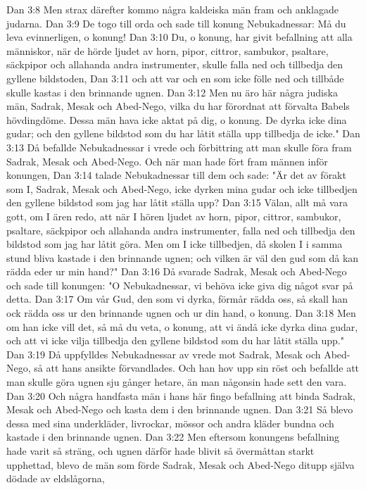 Dan 3:8  Men strax därefter kommo några kaldeiska män fram och anklagade judarna.
Dan 3:9  De togo till orda och sade till konung Nebukadnessar: Må du leva evinnerligen, o konung!
Dan 3:10  Du, o konung, har givit befallning att alla människor, när de hörde ljudet av horn, pipor, cittror, sambukor, psaltare, säckpipor och allahanda andra instrumenter, skulle falla ned och tillbedja den gyllene bildstoden,
Dan 3:11  och att var och en som icke fölle ned och tillbåde skulle kastas i den brinnande ugnen.
Dan 3:12  Men nu äro här några judiska män, Sadrak, Mesak och Abed-Nego, vilka du har förordnat att förvalta Babels hövdingdöme. Dessa män hava icke aktat på dig, o konung. De dyrka icke dina gudar; och den gyllene bildstod som du har låtit ställa upp tillbedja de icke."
Dan 3:13  Då befallde Nebukadnessar i vrede och förbittring att man skulle föra fram Sadrak, Mesak och Abed-Nego. Och när man hade fört fram männen inför konungen,
Dan 3:14  talade Nebukadnessar till dem och sade: "Är det av förakt som I, Sadrak, Mesak och Abed-Nego, icke dyrken mina gudar och icke tillbedjen den gyllene bildstod som jag har låtit ställa upp?
Dan 3:15  Välan, allt må vara gott, om I ären redo, att när I hören ljudet av horn, pipor, cittror, sambukor, psaltare, säckpipor och allahanda andra instrumenter, falla ned och tillbedja den bildstod som jag har låtit göra. Men om I icke tillbedjen, då skolen I i samma stund bliva kastade i den brinnande ugnen; och vilken är väl den gud som då kan rädda eder ur min hand?"
Dan 3:16  Då svarade Sadrak, Mesak och Abed-Nego och sade till konungen: "O Nebukadnessar, vi behöva icke giva dig något svar på detta.
Dan 3:17  Om vår Gud, den som vi dyrka, förmår rädda oss, så skall han ock rädda oss ur den brinnande ugnen och ur din hand, o konung.
Dan 3:18  Men om han icke vill det, så må du veta, o konung, att vi ändå icke dyrka dina gudar, och att vi icke vilja tillbedja den gyllene bildstod som du har låtit ställa upp."
Dan 3:19  Då uppfylldes Nebukadnessar av vrede mot Sadrak, Mesak och Abed-Nego, så att hans ansikte förvandlades. Och han hov upp sin röst och befallde att man skulle göra ugnen sju gånger hetare, än man någonsin hade sett den vara.
Dan 3:20  Och några handfasta män i hans här fingo befallning att binda Sadrak, Mesak och Abed-Nego och kasta dem i den brinnande ugnen.
Dan 3:21  Så blevo dessa med sina underkläder, livrockar, mössor och andra kläder bundna och kastade i den brinnande ugnen.
Dan 3:22  Men eftersom konungens befallning hade varit så sträng, och ugnen därför hade blivit så övermåttan starkt upphettad, blevo de män som förde Sadrak, Mesak och Abed-Nego ditupp själva dödade av eldslågorna,
